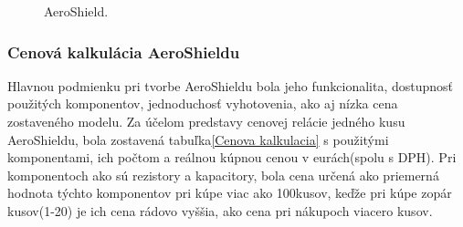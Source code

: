 \begin{figure}
	\hfill
	\hfill
	\hfill
	\caption{AeroShield.}\label{OBRAZOK 1.1}
\end{figure}


\subsubsection{Cenová kalkulácia AeroShieldu}

Hlavnou podmienku pri tvorbe AeroShieldu bola jeho funkcionalita, dostupnosť použitých komponentov, jednoduchosť vyhotovenia, ako aj nízka cena zostaveného modelu. Za účelom predstavy cenovej relácie jedného kusu AeroShieldu, bola zostavená tabuľka\ref{Cenova kalkulacia} s použitými komponentami, ich počtom a reálnou kúpnou cenou v eurách(spolu s DPH). Pri komponentoch ako sú rezistory a kapacitory, bola cena určená ako priemerná hodnota týchto komponentov pri kúpe viac ako 100kusov, keďže pri kúpe zopár kusov(1-20) je ich cena rádovo vyššia, ako cena pri nákupoch viacero kusov. 

